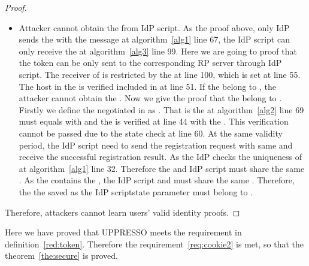 \begin{appendices}
\begin{proof}
\begin{itemize}
\item Attacker cannot obtain the  from IdP script. As the proof above, only IdP sends the  with the message at algorithm~\ref{alg1} line 67, the IdP script can only receive the  at algorithm~\ref{alg3} line 99. Here we are going to proof that the token  can be only sent to the corresponding RP server through IdP script. The receiver of  is restricted by the  at line 100, which is set at line 55. The host in the  is verified included in  at line 51. If the  belong to , the attacker cannot obtain the . Now we give the proof that the  belong to . Firstly we define the negotiated  in  as . That is the  at algorithm~\ref{alg2} line 69 must equals with  and the  is verified at line 44 with the . This verification cannot be passed due to the state check at line 60. At the same validity period, the IdP script need to send the registration request with same   and receive the successful registration result. As the IdP checks the uniqueness of  at algorithm~\ref{alg1} line 32. Therefore the  and IdP script must share the same . As the  contains the , the IdP script and  must share the same . Therefore, the the  saved as the IdP scriptstate parameter must belong to .
\end{itemize}
Therefore, attackers cannot  learn users' valid identity proofs.
\end{proof}
Here we have proved that UPPRESSO meets the requirement in definition~\ref{red:token}. Therefore the requirement~\ref{req:cookie2} is met, so that the theorem~\ref{the:secure} is proved.


\end{appendices}
